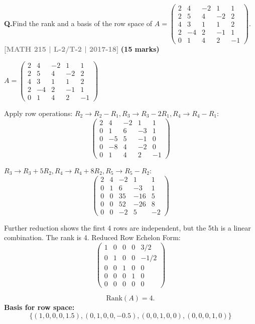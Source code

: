 \documentclass[12pt,a3paper]{article}
\newcommand{\yr}[1]{\hfill\textcolor{gray}{\small\textbf{[#1]}}}
\newcommand{\mk}[1]{\textcolor{orange!70!black}{\small\textbf{(#1 marks)}}}
\newcounter{qnum}
\newcommand{\Q}[1]{%
  \needspace{4\baselineskip}
  \refstepcounter{qnum}
  \vspace{6pt}
  \noindent\textbf{Q\theqnum.}\enspace #1\par
}
\begin{document}
\Q{Find the rank and a basis of the row space of $A = \begin{pmatrix} 2 & 4 & -2 & 1 & 1 \\ 2 & 5 & 4 & -2 & 2 \\ 4 & 3 & 1 & 1 & 2 \\ 2 & -4 & 2 & -1 & 1 \\ 0 & 1 & 4 & 2 & -1 \end{pmatrix}$.
\yr{MATH 215 | L-2/T-2 | 2017-18} \mk{15}}

\begin{tcolorbox}[enhanced,breakable,colback=cB!4,colframe=cB,
  boxrule=0.8pt,arc=5pt,
  title={\textbf{Answer --- Rank and Basis of Row Space}},
  fonttitle=\bfseries\color{white},colbacktitle=cB]

$A = \begin{pmatrix} 2 & 4 & -2 & 1 & 1 \\ 2 & 5 & 4 & -2 & 2 \\ 4 & 3 & 1 & 1 & 2 \\ 2 & -4 & 2 & -1 & 1 \\ 0 & 1 & 4 & 2 & -1 \end{pmatrix}$

Apply row operations:
$R_2 \to R_2 - R_1, R_3 \to R_3 - 2R_1, R_4 \to R_4 - R_1$:
\[ \begin{pmatrix} 2 & 4 & -2 & 1 & 1 \\ 0 & 1 & 6 & -3 & 1 \\ 0 & -5 & 5 & -1 & 0 \\ 0 & -8 & 4 & -2 & 0 \\ 0 & 1 & 4 & 2 & -1 \end{pmatrix} \]

$R_3 \to R_3 + 5R_2, R_4 \to R_4 + 8R_2, R_5 \to R_5 - R_2$:
\[ \begin{pmatrix} 2 & 4 & -2 & 1 & 1 \\ 0 & 1 & 6 & -3 & 1 \\ 0 & 0 & 35 & -16 & 5 \\ 0 & 0 & 52 & -26 & 8 \\ 0 & 0 & -2 & 5 & -2 \end{pmatrix} \]

Further reduction shows the first 4 rows are independent, but the 5th is a linear combination. The rank is 4.
Reduced Row Echelon Form:
\[ \begin{pmatrix} 1 & 0 & 0 & 0 & 3/2 \\ 0 & 1 & 0 & 0 & -1/2 \\ 0 & 0 & 1 & 0 & 0 \\ 0 & 0 & 0 & 1 & 0 \\ 0 & 0 & 0 & 0 & 0 \end{pmatrix} \]

\[ \boxed{\text{Rank}(A) = 4.} \]
\textbf{Basis for row space:}
\[ \boxed{\{(1, 0, 0, 0, 1.5), (0, 1, 0, 0, -0.5), (0, 0, 1, 0, 0), (0, 0, 0, 1, 0)\}} \]
\end{tcolorbox}
\end{document}

